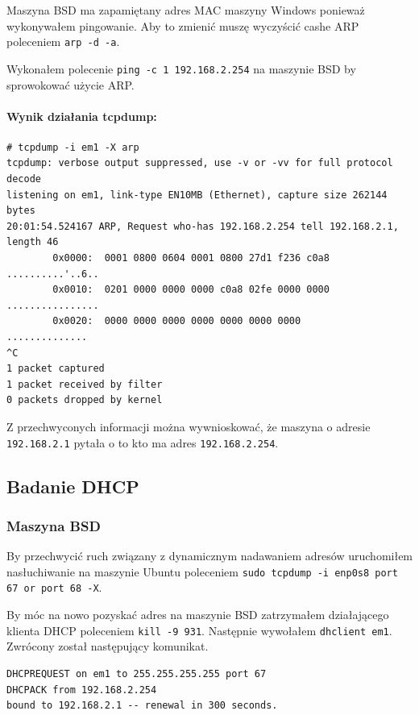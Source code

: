 \documentclass{mwart} %
\begin{document}
Maszyna BSD ma zapamiętany adres MAC maszyny Windows ponieważ wykonywałem pingowanie. Aby to zmienić muszę wyczyścić cashe ARP poleceniem \texttt{arp -d -a}.

Wykonałem polecenie \texttt{ping -c 1 192.168.2.254} na maszynie BSD by sprowokować użycie ARP.

\paragraph{Wynik działania tcpdump:}
\begin{verbatim}
# tcpdump -i em1 -X arp
tcpdump: verbose output suppressed, use -v or -vv for full protocol decode
listening on em1, link-type EN10MB (Ethernet), capture size 262144 bytes
20:01:54.524167 ARP, Request who-has 192.168.2.254 tell 192.168.2.1, length 46 
        0x0000:  0001 0800 0604 0001 0800 27d1 f236 c0a8  ..........'..6..
        0x0010:  0201 0000 0000 0000 c0a8 02fe 0000 0000  ................
        0x0020:  0000 0000 0000 0000 0000 0000 0000       ..............
^C
1 packet captured
1 packet received by filter
0 packets dropped by kernel
\end{verbatim}

Z przechwyconych informacji można wywnioskować, że maszyna o adresie \texttt{192.168.2.1} pytała o to kto ma adres \texttt{192.168.2.254}.

\subsection{Badanie DHCP}

\subsubsection{Maszyna BSD}
By przechwycić ruch związany z dynamicznym nadawaniem adresów uruchomiłem nasłuchiwanie na maszynie Ubuntu poleceniem \texttt{sudo tcpdump -i enp0s8 port 67 or port 68 -X}.

By móc na nowo pozyskać adres na maszynie BSD zatrzymałem działającego klienta DHCP poleceniem \texttt{kill -9 931}. Następnie wywołałem \texttt{dhclient em1}. Zwrócony został następujący komunikat.
\begin{verbatim}
DHCPREQUEST on em1 to 255.255.255.255 port 67 
DHCPACK from 192.168.2.254 
bound to 192.168.2.1 -- renewal in 300 seconds.
\end{verbatim}
\end{document}
